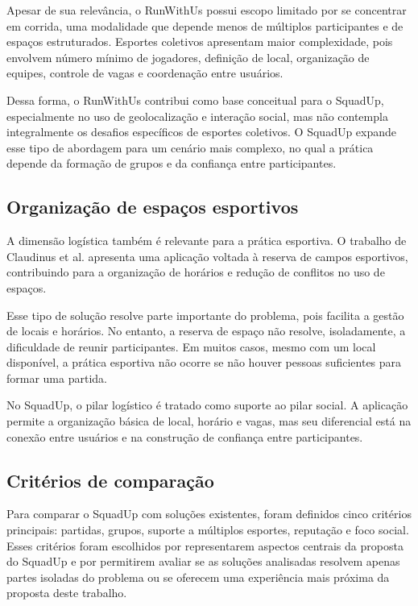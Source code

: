 \documentclass[a4paper, 12pt]{article}
\begin{document}
\begin{justify}
Apesar de sua relevância, o RunWithUs possui escopo limitado por se concentrar em corrida, uma modalidade que depende menos de múltiplos participantes e de espaços estruturados. Esportes coletivos apresentam maior complexidade, pois envolvem número mínimo de jogadores, definição de local, organização de equipes, controle de vagas e coordenação entre usuários.

Dessa forma, o RunWithUs contribui como base conceitual para o SquadUp, especialmente no uso de geolocalização e interação social, mas não contempla integralmente os desafios específicos de esportes coletivos. O SquadUp expande esse tipo de abordagem para um cenário mais complexo, no qual a prática depende da formação de grupos e da confiança entre participantes.

\subsection{Organização de espaços esportivos}

A dimensão logística também é relevante para a prática esportiva. O trabalho de Claudinus et al. \citep{claudinus_sport_2020} apresenta uma aplicação voltada à reserva de campos esportivos, contribuindo para a organização de horários e redução de conflitos no uso de espaços.

Esse tipo de solução resolve parte importante do problema, pois facilita a gestão de locais e horários. No entanto, a reserva de espaço não resolve, isoladamente, a dificuldade de reunir participantes. Em muitos casos, mesmo com um local disponível, a prática esportiva não ocorre se não houver pessoas suficientes para formar uma partida.

No SquadUp, o pilar logístico é tratado como suporte ao pilar social. A aplicação permite a organização básica de local, horário e vagas, mas seu diferencial está na conexão entre usuários e na construção de confiança entre participantes.

\subsection{Critérios de comparação}

Para comparar o SquadUp com soluções existentes, foram definidos cinco critérios principais: partidas, grupos, suporte a múltiplos esportes, reputação e foco social. Esses critérios foram escolhidos por representarem aspectos centrais da proposta do SquadUp e por permitirem avaliar se as soluções analisadas resolvem apenas partes isoladas do problema ou se oferecem uma experiência mais próxima da proposta deste trabalho.


\end{justify}
\end{document}
